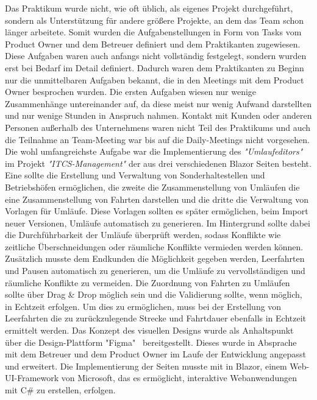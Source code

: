     Das Praktikum wurde nicht, wie oft üblich, als eigenes Projekt durchgeführt, sondern als
    Unterstützung für andere größere Projekte, an dem das Team schon länger arbeitete. Somit wurden die Aufgabenstellungen in Form von Tasks vom Product Owner und dem Betreuer definiert 
    und dem Praktikanten zugewiesen. Diese Aufgaben waren auch anfangs nicht vollständig festgelegt, sondern wurden erst bei Bedarf im Detail definiert. Dadurch waren dem Praktikanten zu Beginn
    nur die unmittelbaren Aufgaben bekannt, die in den Meetings mit dem Product Owner besprochen wurden.
    Die ersten Aufgaben wiesen nur wenige Zusammenhänge untereinander auf, da diese meist nur wenig Aufwand darstellten und nur wenige Stunden in Anspruch nahmen. 
    Kontakt mit Kunden oder anderen Personen außerhalb des Unternehmens waren nicht Teil des Praktikums und auch die Teilnahme an Team-Meeting war bis auf die Daily-Meetings nicht vorgesehen.
    Die wohl umfangreichste Aufgabe war die Implementierung des  \emph{"Umlaufeditors"} im Projekt \emph{"ITCS-Management"} der aus drei verschiedenen Blazor Seiten besteht. Eine sollte die Erstellung 
    und Verwaltung von Sonderhaltestellen und Betriebshöfen ermöglichen, die zweite die Zusammenstellung von Umläufen die eine Zusammenstellung von Fahrten darstellen und 
    die dritte die Verwaltung von Vorlagen für Umläufe. Diese Vorlagen sollten es später ermöglichen, beim Import neuer Versionen, Umläufe automatisch zu generieren. Im Hintergrund sollte dabei
    die Durchführbarkeit der Umläufe überprüft werden, sodass Konflikte wie zeitliche Überschneidungen oder räumliche Konflikte vermieden werden können. Zusätzlich musste dem 
    Endkunden die Möglichkeit gegeben werden, Leerfahrten und Pausen automatisch zu generieren, um die Umläufe zu vervollständigen und räumliche Konflikte zu vermeiden. Die Zuordnung 
    von Fahrten zu Umläufen sollte über Drag \& Drop möglich sein und die Validierung sollte, wenn möglich, in Echtzeit erfolgen. Um dies zu ermöglichen, muss bei der Erstellung von Leerfahrten die zu 
    zurückzulegende Strecke und Fahrtdauer ebenfalls in Echtzeit ermittelt werden.
    Das Konzept des visuellen Designs wurde als Anhaltspunkt über die Design-Plattform "Figma"~\cite{figma} bereitgestellt. Dieses wurde in Absprache mit dem Betreuer und dem 
    Product Owner im Laufe der Entwicklung
    angepasst und erweitert. Die Implementierung der Seiten musste mit in Blazor, einem Web-UI-Framework von Microsoft, das es ermöglicht, interaktive Webanwendungen mit C\# zu erstellen, erfolgen.
    

